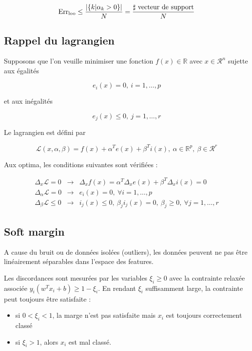 	$$\text{Err}_\text{loo} \leq \frac{\vert \lbrace k \vert \alpha_k > 0 \rbrace \vert}{N} = \frac{\sharp \text{ vecteur de support}}{N}$$
	
	\subsection{Rappel du lagrangien}
	
	Supposons que l'on veuille minimiser une fonction $f(x) \in \mathbb{R}$ avec $x \in \mathcal{R}^n$ sujette aux égalités
	
	$$e_i(x) = 0, \: i = 1, \dots , p$$
	
	et aux inégalités
	
	$$e_j(x) \leq 0, \: j = 1, \dots , r$$
	
	Le lagrangien est défini par
	
	$$\mathcal{L}(x, \alpha, \beta) = f(x) + \alpha^T e(x) + \beta^T i(x), \: \alpha \in \mathbb{R}^p, \: \beta \in \mathcal{R}^r$$
	
	Aux optima, les conditions suivantes sont vérifiées :
	
	\begin{eqnarray*}
	\Delta_x \mathcal{L} = 0 & \rightarrow & \Delta_x f(x) = \alpha^T \Delta_x e(x) + \beta^T \Delta_x i(x) = 0 \\
	\Delta_{\alpha} \mathcal{L} = 0 & \rightarrow & e_i(x) = 0, \: \forall i = 1, \dots , p \\
	\Delta_\beta \mathcal{L} \leq 0 & \rightarrow & i_j(x) \leq 0, \: \beta_j i_j(x) = 0, \: \beta_j \geq 0, \: \forall j = 1, \dots , r
	\end{eqnarray*}
		
	\subsection{Soft margin}
	
	A cause du bruit ou de données isolées (outliers), les données peuvent ne pas être linéairement séparables dans l'espace des features. 
	
	
	Les discordances sont mesurées par les variables $\xi_i \geq 0$ avec la contrainte relaxée associée $y_i(w^Tx_i + b) \geq 1 - \xi_i$. En rendant $\xi_i$ suffisamment large, la contrainte peut toujours être satisfaite :
	
	\begin{itemize}
		\item si $0 < \xi_i < 1$, la marge n'est pas satisfaite mais $x_i$ est toujours correctement classé
		\item si $\xi_i > 1$, alors $x_i$ est mal classé.
	\end{itemize}
	
